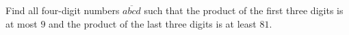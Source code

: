 Find all four-digit numbers $\overline{abcd}$ such that the product of the first three digits is at most $9$ and the product of the last three digits is at least $81$.
